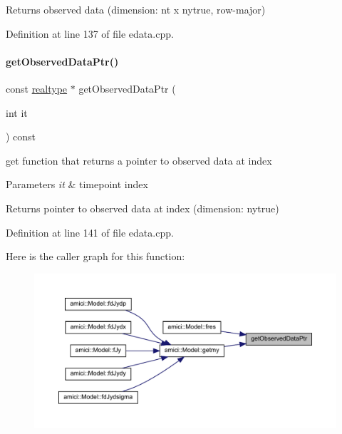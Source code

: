 \begin{DoxyReturn}{Returns}
observed data (dimension\+: nt x nytrue, row-\/major) 
\end{DoxyReturn}


Definition at line 137 of file edata.\+cpp.

\mbox{\label{classamici_1_1_exp_data_a8839910b831f8c55976d880df081fb3e}} 
\paragraph{\texorpdfstring{getObservedDataPtr()}{getObservedDataPtr()}}
{\footnotesize\ttfamily const \mbox{\hyperlink{namespaceamici_a1bdce28051d6a53868f7ccbf5f2c14a3}{realtype}} $\ast$ get\+Observed\+Data\+Ptr (\begin{DoxyParamCaption}\item[{int}]{it }\end{DoxyParamCaption}) const}

get function that returns a pointer to observed data at index


\begin{DoxyParams}{Parameters}
{\em it} & timepoint index \\
\hline
\end{DoxyParams}
\begin{DoxyReturn}{Returns}
pointer to observed data at index (dimension\+: nytrue) 
\end{DoxyReturn}


Definition at line 141 of file edata.\+cpp.

Here is the caller graph for this function\+:
\nopagebreak
\begin{figure}[H]
\begin{center}
\leavevmode
\includegraphics[width=350pt]{classamici_1_1_exp_data_a8839910b831f8c55976d880df081fb3e_icgraph}
\end{center}
\end{figure}
\mbox{\label{classamici_1_1_exp_data_a5d84a162eb705e032820acd004603f29}} 
